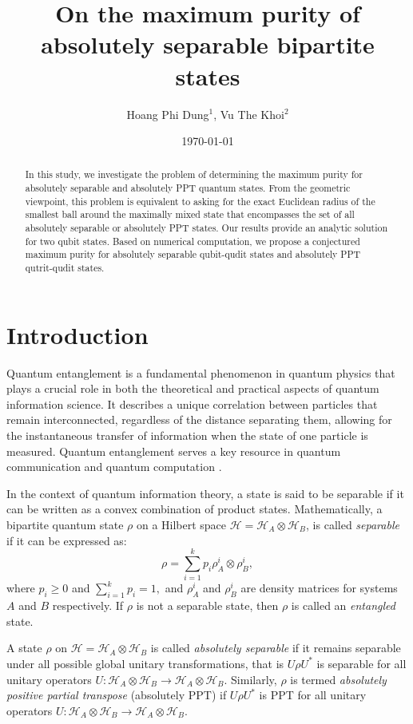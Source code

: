 \documentclass[reqno, 12pt,a4letter]{amsart}
\title{On the maximum purity of absolutely separable bipartite states}
\author{Hoang Phi Dung$^1$, Vu The Khoi$^2$ }
\date{ \today}
\theoremstyle{definition}
\theoremstyle{plain}
\begin{document}
\maketitle

\begin{abstract}
In this study, we investigate the problem of determining the maximum  purity for absolutely separable and absolutely PPT quantum states. From the geometric viewpoint, this problem is equivalent to asking for the exact Euclidean radius of the smallest ball around the maximally mixed state  that encompasses
the set of all absolutely separable or absolutely PPT states. Our results provide an analytic solution for two qubit states. Based on numerical computation, we propose a conjectured maximum purity for absolutely separable qubit-qudit states and absolutely PPT qutrit-qudit states.       

\end{abstract}

\section{Introduction}
Quantum entanglement is a fundamental phenomenon in quantum physics that plays a crucial role in both the theoretical and practical aspects of quantum information science. It describes a unique correlation between particles that remain interconnected, regardless of the distance separating them, allowing for the instantaneous transfer of information when the state of one particle is measured. Quantum entanglement serves a key resource in quantum communication and quantum computation \cite{Horodecki2009}. 


In the context of quantum information theory, a state is said to be separable if it can be written as a convex combination of product states. Mathematically, a bipartite quantum state 
$\rho$ on a Hilbert space $\mathcal{H}=\mathcal{H}_A \otimes \mathcal{H}_B$, is called {\em separable} \cite{Schrodinger1935, Werner1989} if it can be  expressed as:
\begin{equation}\label{def-SEP}
	\rho = \sum_{i=1}^{k} p_i\rho_A^i \otimes {\rho}_B^i,	
\end{equation}
where $p_i\ge 0$ and $\sum_{i=1}^k p_i=1 ,$ and $\rho_A^i$  and ${\rho}_B^i$ are density matrices for systems $A$ and $B$ respectively. If $\rho$ is not a separable state, then $\rho$ is called an {\em entangled} state.


A state $\rho$ on $\mathcal{H}=\mathcal{H}_A \otimes \mathcal{H}_B$ is called {\it absolutely separable} \cite{Kus2001} if it remains separable under all possible global unitary transformations, that is $U\rho U^*$ is separable for all unitary operators $U: \mathcal{H}_A \otimes \mathcal{H}_B \rightarrow \mathcal{H}_A \otimes \mathcal{H}_B.$ Similarly, $\rho$ is termed {\it absolutely positive partial transpose} (absolutely PPT) if $U\rho U^*$ is PPT for all unitary operators $U: \mathcal{H}_A \otimes \mathcal{H}_B \rightarrow \mathcal{H}_A \otimes \mathcal{H}_B.$   
\end{document}
